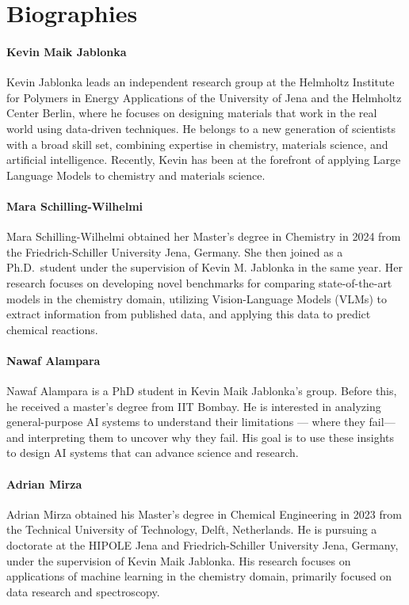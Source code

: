 \section*{Biographies}
\paragraph{Kevin Maik Jablonka}
Kevin Jablonka leads an independent research group at the Helmholtz Institute for Polymers in Energy Applications of the University of Jena and the Helmholtz Center Berlin, where he focuses on designing materials that work in the real world using data-driven techniques. He belongs to a new generation of scientists with a broad skill set, combining expertise in chemistry, materials science, and artificial intelligence. Recently, Kevin has been at the forefront of applying Large Language Models to chemistry and materials science.

\paragraph{Mara Schilling-Wilhelmi}
Mara Schilling-Wilhelmi obtained her Master's degree in Chemistry in 2024 from the Friedrich-Schiller University Jena, Germany. She then joined as a Ph.D.\ student under the supervision of Kevin M. Jablonka in the same year. Her research focuses on developing novel benchmarks for comparing state-of-the-art models in the chemistry domain, utilizing Vision-Language Models (VLMs) to extract information from published data, and applying this data to predict chemical reactions. 

\paragraph{Nawaf Alampara}
Nawaf Alampara is a PhD student in Kevin Maik Jablonka's group. Before this, he received a master's degree from IIT Bombay. He is interested in analyzing general-purpose AI systems to understand their limitations --- where they fail---and interpreting them to uncover why they fail. His goal is to use these insights to design AI systems that can advance science and research.

\paragraph{Adrian Mirza}
Adrian Mirza obtained his Master's degree in Chemical Engineering in 2023 from the Technical University of Technology, Delft, Netherlands. He is pursuing a doctorate at the HIPOLE Jena and Friedrich-Schiller University Jena, Germany, under the supervision of Kevin Maik Jablonka. His research focuses on applications of machine learning in the chemistry domain, primarily focused on data research and spectroscopy.

